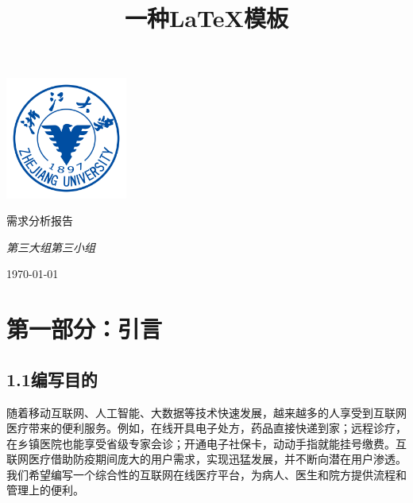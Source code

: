 \documentclass[24pt,a4paper]{article}%
\title{\fontsize{18pt}{27pt}\selectfont%
	{\heiti%
		一种\LaTeX 模板}}%
\date{}%
\begin{document}
\begin{titlepage}
    \centering
    \includegraphics[width=0.3\textwidth]{image/zju_logo.png}\par\vspace{5cm}
    {\huge\songti 需求分析报告\par}
    \vspace{1cm}
    {\Large\itshape 第三大组第三小组\par}
    \vspace{7cm}
    \vfill
    {\large \today\par}
\end{titlepage}
\newpage

\begin{center}
    \kaishu
    \tableofcontents
    \setcounter{page}{0}
    \thispagestyle{empty} %
\end{center}
\newpage

\section*{\songti 第一部分：引言}
\subsection*{\songti 1.1编写目的}
随着移动互联网、人工智能、大数据等技术快速发展，越来越多的人享受到互联网医疗带来的便利服务。例如，在线开具电子处方，药品直接快递到家；远程诊疗，在乡镇医院也能享受省级专家会诊；开通电子社保卡，动动手指就能挂号缴费。互联网医疗借助防疫期间庞大的用户需求，实现迅猛发展，并不断向潜在用户渗透。我们希望编写一个综合性的互联网在线医疗平台，为病人、医生和院方提供流程和管理上的便利。
\end{document}
